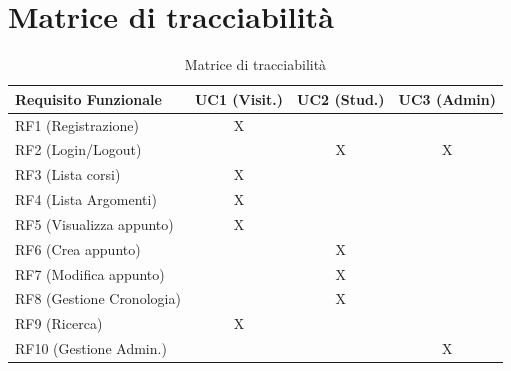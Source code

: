 \section{Matrice di tracciabilità}
\begin{table}[htbp]
    \centering
    \caption{Matrice di tracciabilità}
    \begin{tabular}{lccc}
        \toprule
        Requisito Funzionale & UC1 (Visit.) & UC2 (Stud.) & UC3 (Admin) \\
        \midrule
        RF1 (Registrazione)  & X &   &   \\
        RF2 (Login/Logout)   &   & X & X \\
        RF3 (Lista corsi)    & X &   &   \\
        RF4 (Lista Argomenti)      & X &   &   \\
        RF5 (Visualizza appunto)& X &   &   \\
        RF6 (Crea appunto)   &   & X &   \\
        RF7 (Modifica appunto)       &   & X &   \\
        RF8 (Gestione Cronologia)     &   & X &   \\
        RF9 (Ricerca)        & X &   &   \\
        RF10 (Gestione Admin.)&   &   & X \\
        \bottomrule
    \end{tabular}
\end{table}
